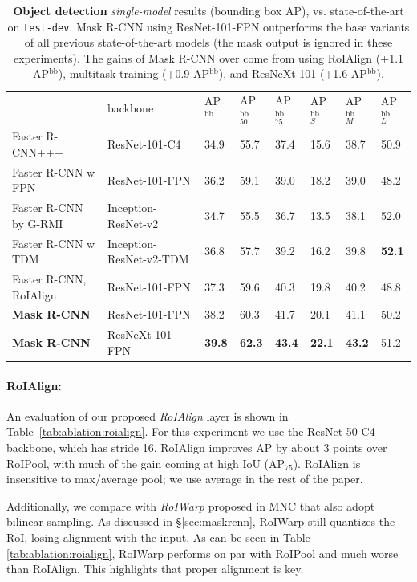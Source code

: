 \begin{table}[t]
\begin{tabular}{l|l|x{22}x{22}x{22}|x{22}x{22}x{22}}
  & backbone
  & AP$^\text{bb}$ & AP$^\text{bb}_{50}$ & AP$^\text{bb}_{75}$
  & AP$^\text{bb}_S$ & AP$^\text{bb}_M$ &  AP$^\text{bb}_L$\\ [.1em]
\shline
  Faster R-CNN+++  & ResNet-101-C4
  & 34.9 & 55.7 & 37.4 & 15.6 & 38.7 & 50.9\\
  Faster R-CNN w FPN  & ResNet-101-FPN
  & 36.2 & 59.1 & 39.0 & 18.2 & 39.0 & 48.2\\
  Faster R-CNN by G-RMI  & Inception-ResNet-v2
  & 34.7 & 55.5 & 36.7 & 13.5 & 38.1 & 52.0\\
  Faster R-CNN w TDM  & Inception-ResNet-v2-TDM
  & 36.8 & 57.7 & 39.2 & 16.2 & 39.8 & \textbf{52.1}\\
\hline
  Faster R-CNN, RoIAlign & ResNet-101-FPN
  & 37.3 & 59.6 & 40.3 & 19.8 & 40.2 & 48.8\\
  \textbf{Mask R-CNN} & ResNet-101-FPN
  & 38.2 & 60.3 & 41.7 & 20.1 & 41.1 & 50.2\\
  \textbf{Mask R-CNN} & ResNeXt-101-FPN
  & \textbf{39.8} & \textbf{62.3} & \textbf{43.4} & \textbf{22.1} & \textbf{43.2} & {51.2}
\end{tabular}
\caption{\textbf{Object detection} \emph{single-model} results (bounding box AP), vs. state-of-the-art on \texttt{test-dev}. Mask R-CNN using ResNet-101-FPN outperforms the base variants of all previous state-of-the-art models (the mask output is ignored in these experiments). The gains of Mask R-CNN over come from using RoIAlign (+1.1 AP$^\text{bb}$), multitask training (+0.9 AP$^\text{bb}$), and ResNeXt-101 (+1.6 AP$^\text{bb}$).}
\label{tab:final_bbox}
\end{table}

\paragraph{RoIAlign:} An evaluation of our proposed \emph{RoIAlign} layer is shown in Table~\ref{tab:ablation:roialign}. For this experiment we use the ResNet-50-C4 backbone, which has stride 16. RoIAlign improves AP by about 3 points over RoIPool, with much of the gain coming at high IoU (AP$_{75}$). RoIAlign is insensitive to max/average pool; we use average in the rest of the paper.

Additionally, we compare with \emph{RoIWarp} proposed in MNC that also adopt bilinear sampling. As discussed in \S\ref{sec:maskrcnn}, RoIWarp still quantizes the RoI, losing alignment with the input. As can be seen in Table \ref{tab:ablation:roialign}, RoIWarp performs on par with RoIPool and much worse than RoIAlign. This highlights that proper alignment is key.

